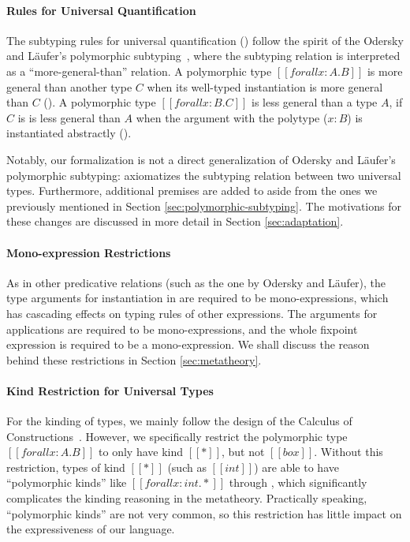 \paragraph{Rules for Universal Quantification}
The subtyping rules for universal quantification () follow
the spirit of the Odersky and L\"aufer's polymorphic subtyping~\cite{odersky1996putting,dunfield2013complete},
where the subtyping relation is interpreted as a ``more-general-than'' relation.
A polymorphic type $[[forall x : A. B]]$
is more general than another type $C$ when its well-typed
instantiation is more general than $C$ (). A polymorphic
type $[[forall x : B. C]]$ is less general than a type $A$,
if $C$ is is less general than $A$ when the argument with the polytype ($x:B$)
is instantiated abstractly ().

Notably, our formalization is not a direct generalization of Odersky and L\"aufer's
polymorphic subtyping:
 axiomatizes the subtyping relation between two universal types.
Furthermore, additional premises are added to  aside from the
ones we previously mentioned in Section \ref{sec:polymorphic-subtyping}.
The motivations for these changes are discussed in more detail in Section \ref{sec:adaptation}.

\paragraph{Mono-expression Restrictions}
As in other predicative relations (such as the one by Odersky and L\"aufer),
the type arguments for instantiation in  are
required to be mono-expressions, which has cascading effects on typing rules of
other expressions. The arguments for applications are required to be
mono-expressions, and the whole fixpoint expression is required to be a
mono-expression. We shall
discuss the reason behind these restrictions in Section \ref{sec:metatheory}.

\paragraph{Kind Restriction for Universal Types}
\label{sec:kind-restriction}

For the kinding of types, we mainly follow the design of the Calculus of
Constructions~\cite{coc}. However, we specifically restrict
the polymorphic type $[[forall x : A. B]]$ to only have kind $[[*]]$, but not $[[box]]$.
Without this restriction, types of kind $[[*]]$ (such as $[[int]]$) are able to
have ``polymorphic kinds'' like $[[forall x : int. *]]$ through ,
which significantly complicates the kinding reasoning in the metatheory.
Practically speaking, ``polymorphic kinds'' are not very common, so this
restriction has little impact on the expressiveness of our language.

